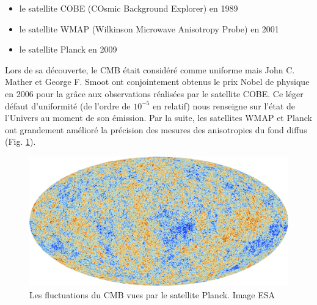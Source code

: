 \begin{itemize}
\item le satellite COBE (COsmic Background Explorer) en 1989
\item le satellite WMAP (Wilkinson Microwave Anisotropy Probe) en 2001
\item le satellite Planck en 2009
\end{itemize}

%
%

Lors de sa découverte, le \ac{CMB} était considéré comme uniforme mais John C. Mather et George F. Smoot ont conjointement obtenus le prix Nobel de physique en 2006 pour la \cite{CMBanisotropiesNobel} grâce aux observations réalisées par le satellite  COBE.
Ce léger défaut d'uniformité (de l'ordre de $10^{-5}$ en relatif) nous renseigne sur l’état de l'Univers au moment de son émission.
Par la suite, les satellites WMAP et Planck ont grandement amélioré la précision des mesures des anisotropies du fond diffus (Fig. \ref{fig:cmb}).

\begin{figure}
        \includegraphics[width=0.95 \textwidth]{img/01/CMB.jpeg} 

        \caption[CMB]{Les fluctuations du \ac{CMB} vues par le satellite Planck. 
        Image ESA}
 		\label{fig:cmb}
\end{figure}

